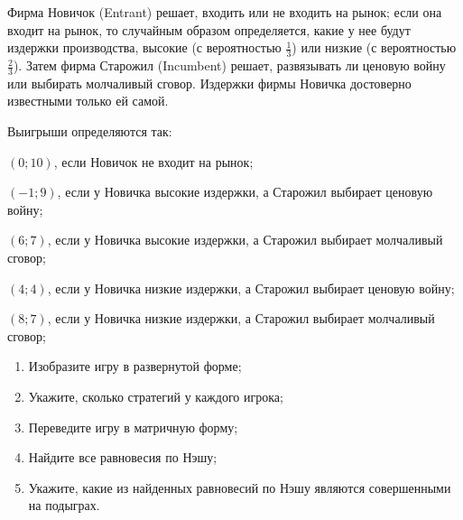\begin{problem}
Фирма Новичок (Entrant) решает, входить или не входить на рынок; если она входит на рынок, то случайным образом определяется, какие у нее будут издержки производства, высокие (с вероятностью  $\frac{1}{3} $) или низкие (с вероятностью  $\frac{2}{3} $). Затем фирма Старожил (Incumbent) решает, развязывать ли ценовую войну или выбирать молчаливый сговор. Издержки фирмы Новичка достоверно известными только ей самой.\par
Выигрыши определяются так:\par
$\displaystyle \left(0;10\right)$, если Новичок не входит на рынок;\par
$\displaystyle \left(-1;9\right)$, если у Новичка высокие издержки, а Старожил выбирает ценовую войну;\par
$\displaystyle \left(6;7\right)$, если у Новичка высокие издержки, а Старожил выбирает молчаливый сговор;\par
$\displaystyle \left(4;4\right)$, если у Новичка низкие издержки, а Старожил выбирает ценовую войну;\par
$\displaystyle \left(8;7\right)$, если у Новичка низкие издержки, а Старожил выбирает молчаливый сговор;\par
\begin{enumerate}
\item Изобразите игру в развернутой форме;\par
\item Укажите, сколько стратегий у каждого игрока;\par
\item  Переведите игру в матричную форму;\par
\item Найдите все равновесия по Нэшу;\par
\item Укажите, какие из найденных равновесий по Нэшу являются совершенными на подыграх.\par
\end{enumerate}


\begin{sol}

\end{sol}
\end{problem}



